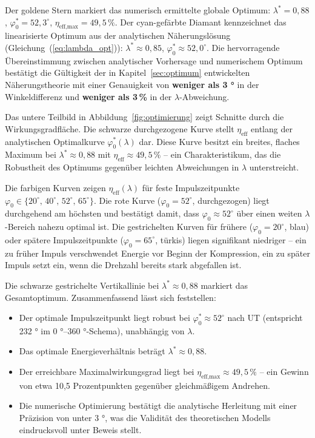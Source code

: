 ﻿\documentclass[a4paper,12pt]{article}
\begin{document}
Der goldene Stern markiert das numerisch ermittelte globale Optimum:
$\lambda^* = 0{,}88$, $\varphi_0^* = 52{,}3^\circ$, $\eta_\text{eff,max} = 49{,}5\,\%$.
Der cyan-gefärbte Diamant kennzeichnet das linearisierte Optimum aus der
analytischen Näherungslösung (Gleichung~(\ref{eq:lambda_opt})): $\lambda^* \approx 0{,}85$,
$\varphi_0^* \approx 52{,}0^\circ$. Die hervorragende Übereinstimmung zwischen
analytischer Vorhersage und numerischem Optimum bestätigt die Gültigkeit
der in Kapitel~\ref{sec:optimum} entwickelten Näherungstheorie mit einer
Genauigkeit von \textbf{weniger als 3 °} in der Winkeldifferenz und
\textbf{weniger als 3\,\%} in der $\lambda$-Abweichung.

Das untere Teilbild in Abbildung~\ref{fig:optimierung} zeigt Schnitte durch
die Wirkungsgradfläche. Die schwarze durchgezogene Kurve stellt $\eta_\text{eff}$
entlang der analytischen Optimalkurve $\varphi_0^*(\lambda)$ dar. Diese Kurve
besitzt ein breites, flaches Maximum bei $\lambda^* \approx 0{,}88$ mit
$\eta_\text{eff} \approx 49{,}5\,\%$ -- ein Charakteristikum, das die Robustheit
des Optimums gegenüber leichten Abweichungen in $\lambda$ unterstreicht.

Die farbigen Kurven zeigen $\eta_\text{eff}(\lambda)$ für feste Impulszeitpunkte
$\varphi_0 \in \{20^\circ,\, 40^\circ,\, 52^\circ,\, 65^\circ\}$. Die rote
Kurve ($\varphi_0 = 52^\circ$, durchgezogen) liegt durchgehend am höchsten
und bestätigt damit, dass $\varphi_0 \approx 52^\circ$ über einen weiten
$\lambda$-Bereich nahezu optimal ist. Die gestrichelten Kurven für frühere
($\varphi_0 = 20^\circ$, blau) oder spätere Impulszeitpunkte ($\varphi_0 = 65^\circ$,
türkis) liegen signifikant niedriger -- ein zu früher Impuls verschwendet
Energie vor Beginn der Kompression, ein zu später Impuls setzt ein, wenn
die Drehzahl bereits stark abgefallen ist.

Die schwarze gestrichelte Vertikallinie bei $\lambda^* \approx 0{,}88$ markiert
das Gesamtoptimum. Zusammenfassend lässt sich feststellen:

\begin{itemize}
  \item Der optimale Impulszeitpunkt liegt robust bei $\varphi_0^* \approx 52^\circ$
    nach UT (entspricht 232 ° im 0 °--360 °-Schema), unabhängig von $\lambda$.
  \item Das optimale Energieverhältnis beträgt $\lambda^* \approx 0{,}88$.
  \item Der erreichbare Maximalwirkungsgrad liegt bei $\eta_\text{eff,max} \approx 49{,}5\,\%$ --
    ein Gewinn von etwa 10{,}5 Prozentpunkten gegenüber gleichmäßigem Andrehen.
  \item Die numerische Optimierung bestätigt die analytische Herleitung mit einer
    Präzision von unter 3 °, was die Validität des theoretischen Modells eindrucksvoll
    unter Beweis stellt.
\end{itemize}
\end{document}
